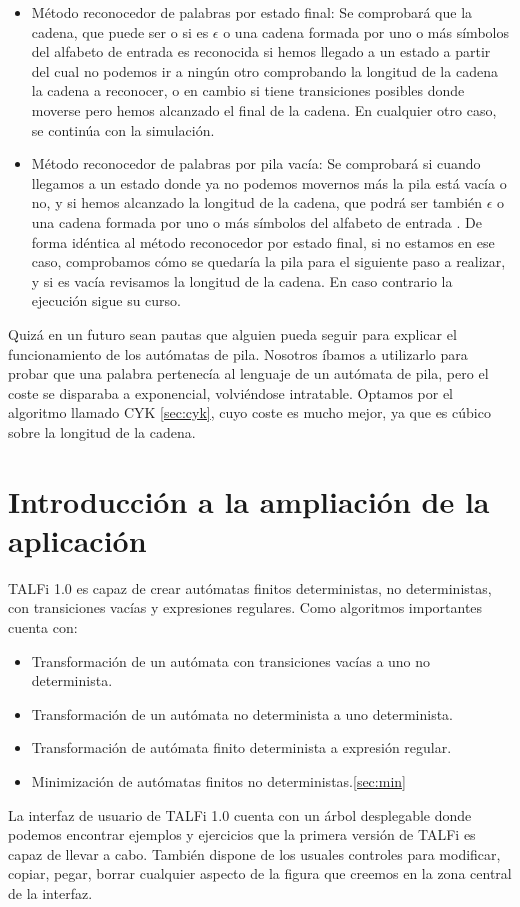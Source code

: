\documentclass[12pt,a4paper,spanish]{book}
\begin{document}
\begin{itemize}

\item M\'etodo reconocedor de palabras por estado final: Se comprobar\'a que la cadena, que puede ser o si es $\epsilon$ o una cadena formada por uno o m\'as s\'imbolos del alfabeto de entrada es reconocida si hemos llegado a un estado a partir del cual no podemos ir a ning\'un otro comprobando la longitud de la cadena la cadena a reconocer, o en cambio si tiene transiciones posibles donde moverse pero hemos alcanzado el final de la cadena. En cualquier otro caso, se contin\'ua con la simulaci\'on.

\item M\'etodo reconocedor de palabras por pila vac\'ia: Se comprobar\'a si cuando llegamos a un estado donde ya no podemos movernos m\'as la pila est\'a vac\'ia o no, y si hemos alcanzado la longitud de la cadena, que podr\'a ser tambi\'en $\epsilon$ o una cadena formada por uno o m\'as s\'imbolos del alfabeto de entrada . De forma id\'entica al m\'etodo reconocedor por estado final, si no estamos en ese caso, comprobamos c\'omo se quedar\'ia la pila para el siguiente paso a realizar, y si es vac\'ia revisamos la longitud de la cadena. En caso contrario la ejecuci\'on sigue su curso.

\end{itemize}

Quiz\'a en un futuro sean pautas que alguien pueda seguir para explicar el funcionamiento de los aut\'omatas de pila. Nosotros \'ibamos a utilizarlo para probar que una palabra pertenec\'ia al lenguaje de un aut\'omata de pila, pero el coste se disparaba a exponencial, volvi\'endose intratable. Optamos por el algoritmo llamado CYK \ref{sec:cyk}, cuyo coste es mucho mejor, ya que es c\'ubico sobre la longitud de la cadena.

\section{Introducci\'on a la ampliaci\'on de la aplicaci\'on}


TALFi 1.0 es capaz de crear aut\'omatas finitos deterministas, no deterministas, con transiciones vac\'ias y expresiones regulares.
Como algoritmos importantes cuenta con:
\begin{itemize}
\item Transformaci\'on de un aut\'omata con transiciones vac\'ias a uno no determinista.
\item Transformaci\'on de un aut\'omata no determinista a uno determinista.
\item Transformaci\'on de aut\'omata finito determinista a expresi\'on regular.
\item Minimizaci\'on de aut\'omatas finitos no deterministas.\ref{sec:min}\\
\end{itemize}
La interfaz de usuario de TALFi 1.0 cuenta con un \'arbol desplegable donde podemos encontrar ejemplos y ejercicios que la primera versi\'on de TALFi es capaz de llevar a cabo. Tambi\'en dispone de los usuales controles para modificar, copiar, pegar, borrar cualquier aspecto de la figura que creemos en la zona central de la interfaz.
\end{document}
